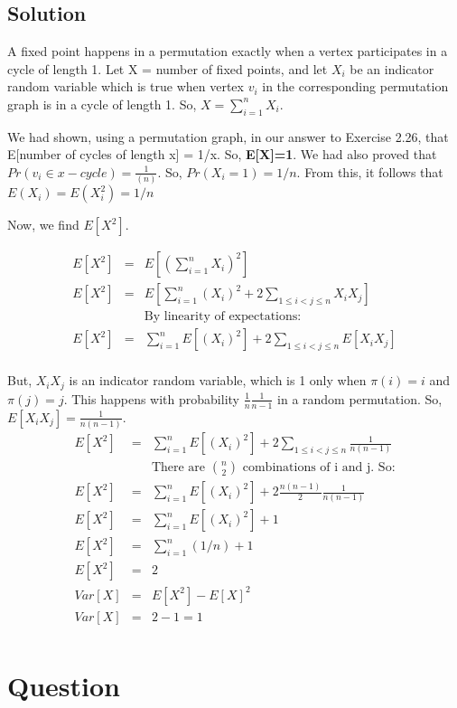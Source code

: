 \documentclass[10pt]{article}
\begin{document}
\subsection{Solution}

A fixed point happens in a permutation exactly when a vertex participates in a cycle of length 1. Let X = number of fixed points, and let $X_{i}$ be an indicator random variable which is true when vertex $v_{i}$ in the corresponding permutation graph is in a cycle of length 1. So, $X=\sum_{i=1}^{n}X_{i}$.

We had shown, using a permutation graph, in our answer to Exercise 2.26, that E[number of cycles of length x] = 1/x. So, \textbf{E[X]=1}. We had also proved that $Pr(v_{i} \in x-cycle) = \frac{1}{(n)}$. So, $Pr(X_{i}=1)=1/n$. From this, it follows that $E(X_{i})=E(X_{i}^{2})=1/n$

Now, we find $E[X^{2}]$.

\begin{eqnarray}
E[X^{2}] &=& E[(\sum_{i=1}^{n}X_{i})^{2}]\\
E[X^{2}] &=& E[\sum_{i=1}^{n}(X_{i})^{2}+2\sum_{1 \leq i<j\leq n}X_{i}X_{j}]\\
&&\text{By linearity of expectations:}\\
E[X^{2}] &=& \sum_{i=1}^{n}E[(X_{i})^{2}]+2\sum_{1 \leq i<j\leq n}E[X_{i}X_{j}]\\
\end{eqnarray}

But, $X_{i}X_{j}$ is an indicator random variable, which is 1 only when $\pi(i)=i$ and $\pi(j)=j$. This happens with probability $\frac{1}{n}\frac{1}{n-1}$ in a random permutation. So, $E[X_{i}X_{j}]=\frac{1}{n(n-1)}$.
\begin{eqnarray}
E[X^{2}] &=& \sum_{i=1}^{n}E[(X_{i})^{2}]+2\sum_{1 \leq i<j\leq n}\frac{1}{n(n-1)}\\
&&\text{There are $\binom{n}{2}$ combinations of i and j. So:}\\
E[X^{2}] &=& \sum_{i=1}^{n}E[(X_{i})^{2}]+2\frac{n(n-1)}{2}\frac{1}{n(n-1)}\\
E[X^{2}] &=& \sum_{i=1}^{n}E[(X_{i})^{2}]+1\\
E[X^{2}] &=& \sum_{i=1}^{n}(1/n)+1\\
E[X^{2}] &=& 2\\
Var[X] &=& E[X^{2}]-E[X]^{2}\\
Var[X] &=& 2-1=1\\
\end{eqnarray}

\section{Question}
\end{document}
